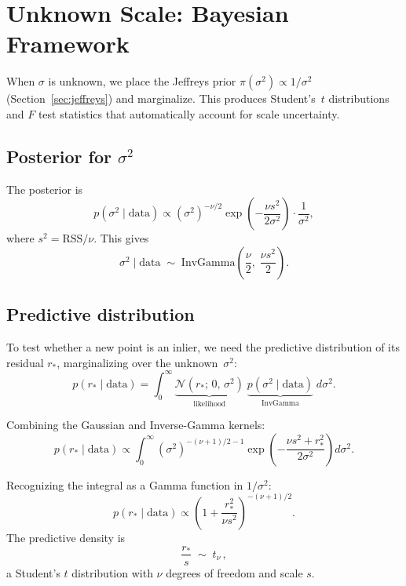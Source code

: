 \documentclass[11pt]{article}
\newcommand{\Normal}{\mathcal{N}}
\newcommand{\data}{\mathrm{data}}
\newcommand{\InvGamma}{\mathrm{InvGamma}}
\begin{document}
\section{Unknown Scale: Bayesian Framework}
\label{sec:unknown}

When $\sigma$ is unknown, we place the Jeffreys prior
$\pi(\sigma^2) \propto 1/\sigma^2$ (Section~\ref{sec:jeffreys}) and
marginalize. This produces Student's~$t$ distributions and $F$ test
statistics that automatically account for scale uncertainty.

\subsection{Posterior for $\sigma^2$}

The posterior is
\begin{equation}
  p(\sigma^2 \mid \data)
  \propto (\sigma^2)^{-\nu/2} \exp\!\left(-\frac{\nu s^2}{2\sigma^2}\right)
  \cdot \frac{1}{\sigma^2},
\end{equation}
where $s^2 = \mathrm{RSS}/\nu$. This gives
\begin{equation}
  \sigma^2 \mid \data \;\sim\; \InvGamma\!\left(\frac{\nu}{2},\; \frac{\nu s^2}{2}\right).
\end{equation}

\subsection{Predictive distribution}

To test whether a new point is an inlier, we need the predictive distribution
of its residual $r_*$, marginalizing over the unknown~$\sigma^2$:
\begin{equation}
  p(r_* \mid \data)
  = \int_0^\infty
    \underbrace{\Normal(r_*;\, 0,\, \sigma^2)}_{\text{likelihood}}
    \;\underbrace{p(\sigma^2 \mid \data)}_{\InvGamma}
    \; d\sigma^2.
\end{equation}

Combining the Gaussian and Inverse-Gamma kernels:
\begin{equation}
  p(r_* \mid \data)
  \propto \int_0^\infty
    (\sigma^2)^{-(\nu+1)/2 - 1}
    \exp\!\left(-\frac{\nu s^2 + r_*^2}{2\sigma^2}\right)
    d\sigma^2.
\end{equation}

Recognizing the integral as a Gamma function in $1/\sigma^2$:
\begin{equation}
  p(r_* \mid \data)
  \propto \left(1 + \frac{r_*^2}{\nu s^2}\right)^{-(\nu+1)/2}.
\end{equation}
The predictive density is
\begin{equation}
  \boxed{\frac{r_*}{s} \;\sim\; t_\nu\,,}
\end{equation}
a Student's $t$ distribution with $\nu$ degrees of freedom and scale $s$.
\end{document}
